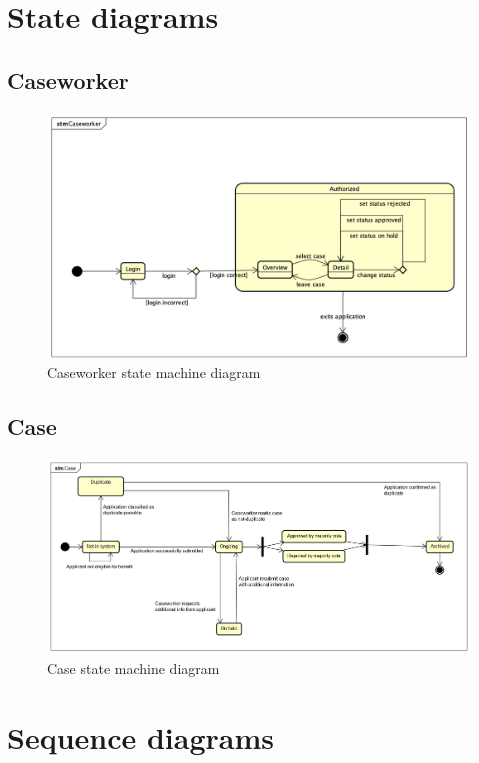 \newpage
{}
\section{State diagrams}
\subsection{Caseworker}
\begin{figure}[htb!]
    \centering
    \includegraphics[width=\textwidth]{img/stm-caseworker.png}
    \caption{Caseworker state machine diagram}
\end{figure}

\subsection{Case}
\begin{figure}[htb!]
    \centering
    \includegraphics[width=\textwidth]{img/stm-case.png}
    \caption{Case state machine diagram}
\end{figure}

\newpage
\section{Sequence diagrams}

